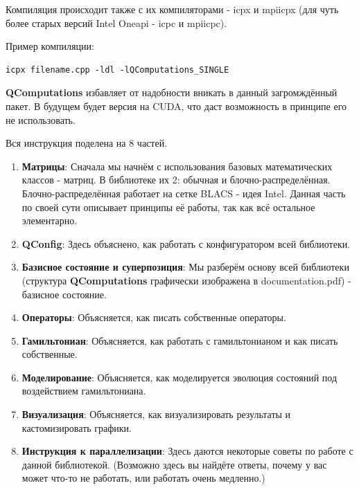 \documentclass[12pt,fleqn]{article}
\begin{document}
        Компиляция происходит также с их компиляторами - \textsf{icpx} и \textsf{mpiicpx}
        (для чуть более старых версий \textsf{Intel Oneapi} - \textsf{icpc} и \textsf{mpiicpc}).

        Пример компиляции:

\begin{mdframed}[linecolor=black, topline=true, bottomline=true,
    leftline=false, rightline=false]
\begin{verbatim}
icpx filename.cpp -ldl -lQComputations_SINGLE
\end{verbatim}
\end{mdframed}

         \textbf{QComputations} избавляет от надобности вникать в данный загромждённый пакет. В будущем будет версия на \textsf{CUDA}, что даст возможность в принципе его не использовать.

        Вся инструкция поделена на 8 частей.
        \begin{enumerate}
            \item{\textbf{Матрицы}: Сначала мы начнём с использования базовых математических классов - матриц. В библиотеке их 2: обычная и блочно-распределённая.
        Блочно-распределённая работает на сетке \textsf{BLACS} - идея Intel. Данная часть по своей сути описывает принципы её работы, так как всё остальное элементарно.}
            \item{\textbf{QConfig}: Здесь объяснено, как работать с конфигуратором всей библиотеки.}
            \item{\textbf{Базисное состояние и суперпозиция}: Мы разберём основу всей библиотеки (структура \textbf{QComputations}
             графически изображена в \textsf{documentation.pdf}) - базисное состояние.}
            \item{\textbf{Операторы}: Объясняется, как писать собственные операторы.}
            \item{\textbf{Гамильтониан}: Объясняется, как работать с гамильтонианом и как писать собственные.}
            \item{\textbf{Моделирование}: Объясняется, как моделируется эволюция состояний под воздействием гамильтониана.}
            \item{\textbf{Визуализация}: Объясняется, как визуализировать результаты и кастомизировать графики.}
            \item{\textbf{Инструкция к параллелизации}: Здесь даются некоторые советы по работе с данной библиотекой. (Возможно здесь вы найдёте ответы,
            почему у вас может что-то не работать, или работать очень медленно.)}
        \end{enumerate}
\end{document}
